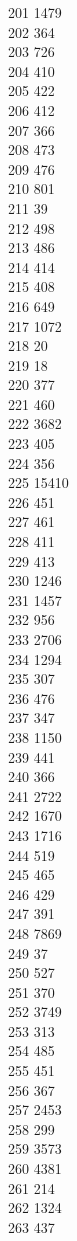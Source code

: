 { 201	1479 \\
 202	364 \\
 203	726 \\
 204	410 \\
 205	422 \\
 206	412 \\
 207	366 \\
 208	473 \\
 209	476 \\
 210	801 \\
 211	39 \\
 212	498 \\
 213	486 \\
 214	414 \\
 215	408 \\
 216	649 \\
 217	1072 \\
 218	20 \\
 219	18 \\
 220	377 \\
 221	460 \\
 222	3682 \\
 223	405 \\
 224	356 \\
 225	15410 \\
 226	451 \\
 227	461 \\
 228	411 \\
 229	413 \\
 230	1246 \\
 231	1457 \\
 232	956 \\
 233	2706 \\
 234	1294 \\
 235	307 \\
 236	476 \\
 237	347 \\
 238	1150 \\
 239	441 \\
 240	366 \\
 241	2722 \\
 242	1670 \\
 243	1716 \\
 244	519 \\
 245	465 \\
 246	429 \\
 247	391 \\
 248	7869 \\
 249	37 \\
 250	527 \\
 251	370 \\
 252	3749 \\
 253	313 \\
 254	485 \\
 255	451 \\
 256	367 \\
 257	2453 \\
 258	299 \\
 259	3573 \\
 260	4381 \\
 261	214 \\
 262	1324 \\
 263	437 \\
}
